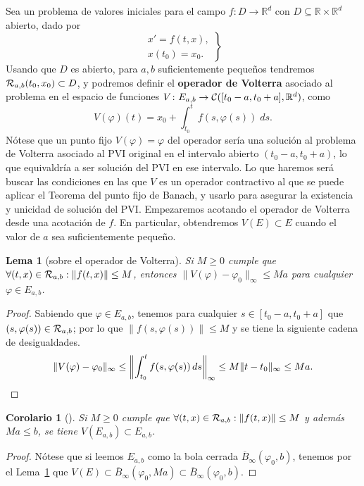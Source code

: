 \documentclass[11pt]{article}
\theoremstyle{plain}
\newtheorem{lemma}{Lema}
\newtheorem{corollary}{Corolario}
\theoremstyle{definition}
\theoremstyle{remark}
\begin{document}
Sea un problema de valores iniciales para el campo $f \colon D \to \mathbb{R}^d$ con $D \subseteq \mathbb{R}\times\mathbb{R}^d$
abierto, dado por
\[\left.\begin{array}{l}
          x' = f(t,x), \\
          x(t_0) = x_0.
\end{array}\right\}\]
Usando que $D$ es abierto, para $a,b$ suficientemente pequeños tendremos ${\cal R}_{a,b}(t_0,x_0) \subset D$,
y podremos definir el \textbf{operador de Volterra} asociado al problema en el
espacio de funciones $V \colon E_{a,b} \to {\cal C}([t_0-a,t_0+a], \mathbb{R}^d)$, como
\[
  V(\varphi)(t) = x_0 + \int_{t_0}^t f(s,\varphi(s))\;ds.
\]
Nótese que un punto fijo $V(\varphi) = \varphi$ del operador sería una solución al problema
de Volterra asociado al PVI original en el intervalo abierto $(t_0-a,t_0+a)$, lo
que equivaldría a ser solución del PVI en ese intervalo. Lo que haremos será
buscar las condiciones en las que $V$ es un operador contractivo al que se
puede aplicar el Teorema del punto fijo de Banach, y usarlo para asegurar
la existencia y unicidad de solución del PVI\@. Empezaremos acotando el
operador de Volterra desde una acotación de $f$. En particular, obtendremos $V(E) \subset E$
cuando el valor de $a$ sea suficientemente pequeño.


\begin{lemma}[sobre el operador de Volterra]\label{lema-operador-volterra}
  Si \(M\geq 0\) cumple que \(\forall (t,x) \in {\cal R}_{a,b}: \|f(t,x)\| \leq M\), entonces
  \(\|V(\varphi) - \varphi_0\|_{\infty} \leq Ma\) para cualquier \(\varphi \in E_{a,b}\).
\end{lemma}
\begin{proof}
  Sabiendo que \(\varphi \in E_{a,b}\), tenemos para cualquier \(s \in [t_0-a,t_0+a]\) que \((s,\varphi(s)) \in {\cal R}_{a,b}\);
  por lo que \(\|f(s,\varphi(s))\| \leq M\) y se tiene la siguiente cadena de desigualdades.
  \[ 
    \| V(\varphi) - \varphi_0 \|_{\infty} \leq
    \left\| \int_{t_0}^t f(s,\varphi(s))\,ds \right\|_{\infty} \leq
    M\| t - t_0 \|_{\infty} \leq
    Ma.\qedhere
  \]
\end{proof}

\begin{corollary}[]\label{corolario-1-volterra}
   Si \(M \geq 0\) cumple que \(\forall (t,x) \in {\cal R}_{a,b}: \|f(t,x)\| \leq M\) y además
   \(Ma \leq b\), se tiene \(V(E_{a,b}) \subset E_{a,b}\).
\end{corollary}
\begin{proof}
  Nótese que si leemos \(E_{a,b}\) como la bola cerrada \(\overline{B}_{\infty}(\varphi_0,b)\), tenemos
  por el Lema~\ref{lema-operador-volterra} que \(V(E) \subset \overline{B}_{\infty}(\varphi_0,Ma) \subset \overline{B}_{\infty}(\varphi_0,b)\).
\end{proof}
\end{document}
